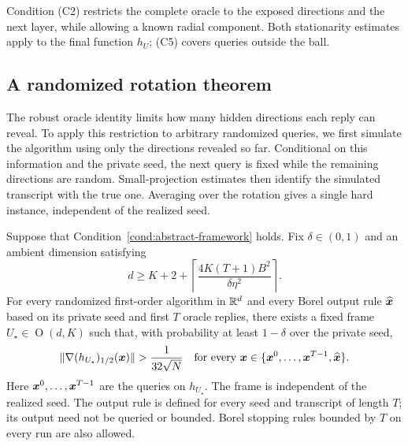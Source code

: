 Condition \textnormal{(C2)} restricts the complete oracle to the
exposed directions and the next layer, while allowing a known radial
component. Both stationarity estimates apply to the final function
$h_U$; \textnormal{(C5)} covers queries outside the ball.

\subsection{A randomized rotation theorem}
\label{subsec:randomized-rotation}

The robust oracle identity limits how many hidden directions each
reply can reveal. To apply this restriction to arbitrary randomized
queries, we first simulate the algorithm using only the directions
revealed so far. Conditional on this information and the private seed,
the next query is fixed while the remaining directions are random.
Small-projection estimates then identify the simulated transcript
with the true one. Averaging over the rotation gives a single hard
instance, independent of the realized seed.
\begin{theorem}
\label{thm:abstract-randomized}
Suppose that Condition~\ref{cond:abstract-framework} holds.
Fix $\delta\in(0,1)$ and an ambient dimension satisfying
\begin{equation}
 d\geq K+2+
 \left\lceil\frac{4K(T+1)B^2}{\delta\eta^2}\right\rceil.
 \label{eq:framework-dimension}
\end{equation}
For every randomized first-order algorithm in ${\mathbb{R}}^d$ and every
Borel output rule $\widehat{\bm{x}}$ based on its private seed and
first $T$ oracle replies, there exists a fixed frame
$U_\star\in\operatorname O(d,K)$ such that, with probability
at least $1-\delta$ over the private seed,
\[
 \|\nabla(h_{U_\star})_{1/2}(\x)\|>\frac1{32\sqrt N}
 \quad\text{for every }\x\in
 \{\x^0,\ldots,\x^{T-1},\widehat\x\}.
\]
Here $\bm{x}^0,\ldots,\bm{x}^{T-1}$ are the queries on $h_{U_\star}$.
The frame is independent of the realized seed. The output rule is
defined for every seed and transcript of length $T$; its output
need not be queried or bounded. Borel stopping rules bounded by $T$
on every run are also allowed.
\end{theorem}

